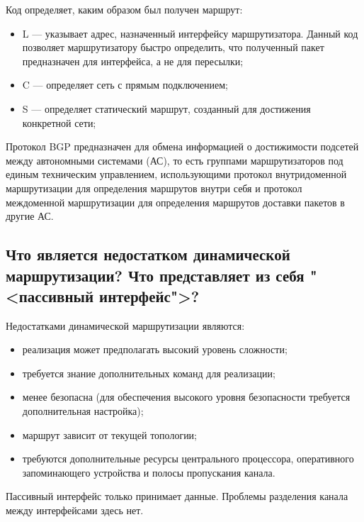 Код определяет, каким образом был получен маршрут:
\begin{itemize}
	\item L --- указывает адрес, назначенный интерфейсу маршрутизатора.
		Данный код позволяет маршрутизатору быстро определить,
		что полученный пакет предназначен для интерфейса, а не для пересылки;
	\item C --- определяет сеть с прямым подключением;
	\item S --- определяет статический маршрут,
		созданный для достижения конкретной сети;
\end{itemize}

Протокол BGP предназначен для обмена информацией о достижимости подсетей
между автономными системами (АС), то есть группами маршрутизаторов
под единым техническим управлением, использующими протокол
внутридоменной маршрутизации для определения маршрутов внутри себя
и протокол междоменной маршрутизации для определения маршрутов
доставки пакетов в другие АС.

\subsection{Что является недостатком динамической маршрутизации?
	Что представляет из себя "<пассивный интерфейс">?}

Недостатками динамической маршрутизации являются:

\begin{itemize}
	\item реализация может предполагать высокий уровень сложности;
	\item требуется знание дополнительных команд для реализации;
	\item менее безопасна (для обеспечения высокого уровня безопасности
		требуется дополнительная настройка);
	\item маршрут зависит от текущей топологии;
	\item требуются дополнительные ресурсы центрального процессора,
		оперативного запоминающего устройства и полосы пропускания канала.
\end{itemize}

Пассивный интерфейс только принимает данные.
Проблемы разделения канала между интерфейсами здесь нет.


